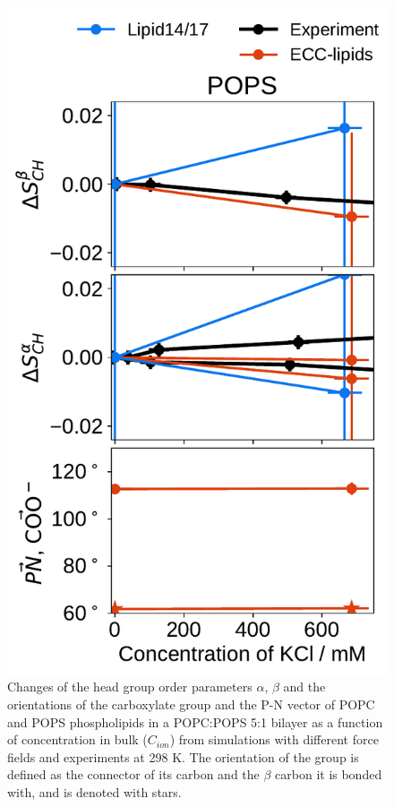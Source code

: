 \begin{figure}[tbp!]
  \includegraphics[width=\figwidthsmall]{../img/ecc_pops/order_parameters_changes_ecc-lip_L14_A-B-PN-COO_POPS_kcl.pdf} 
  \caption{\label{fig:delta_ordPar_KCl} 
    Changes of the head group order parameters $\alpha$, $\beta$ and the orientations of the carboxylate group and the P-N vector  
    of POPC and POPS phospholipids in a POPC:POPS 5:1 bilayer as a function of  concentration 
    in bulk ($C_{ion}$) from simulations with different force fields and experiments at 298 K. \citep{roux90}
    The orientation of the  group is defined as the connector of its carbon and the $\beta$ carbon it is bonded with, and is denoted with stars. 
  } 
\end{figure} 
 


